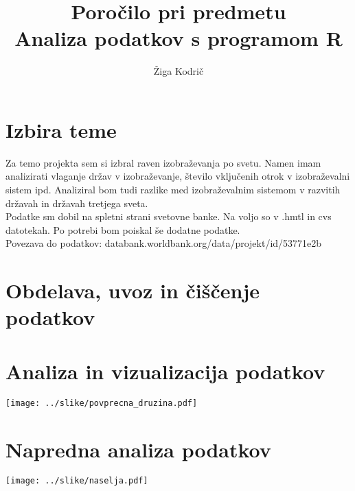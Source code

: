 \documentclass[11pt,a4paper]{article}
\begin{document}
\title{Poročilo pri predmetu \\
Analiza podatkov s programom R}
\author{Žiga Kodrič}
\maketitle

\section{Izbira teme}
Za temo projekta sem si izbral raven izobraževanja po svetu. Namen imam analizirati vlaganje držav v izobraževanje, število vključenih otrok v izobraževalni sistem ipd. Analiziral bom tudi razlike med izobraževalnim sistemom v razvitih državah in državah tretjega sveta.
\\
Podatke sm dobil na spletni strani svetovne banke. Na voljo so v .hmtl in cvs datotekah. Po potrebi bom poiskal še dodatne podatke.
\\
Povezava do podatkov: databank.worldbank.org/data/projekt/id/53771e2b
\section{Obdelava, uvoz in čiščenje podatkov}

\section{Analiza in vizualizacija podatkov}

\texttt{[image: ../slike/povprecna\_druzina.pdf]}

\section{Napredna analiza podatkov}

\texttt{[image: ../slike/naselja.pdf]}
\end{document}
